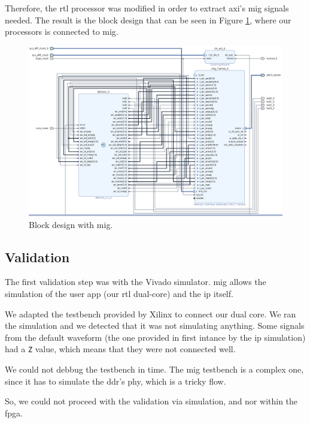 Therefore, the \gls{rtl} processor was modified in order to extract \gls{axi}'s \gls{mig} signals needed. 
The result is the block design that can be seen in Figure \ref{fig:bd_mig}, where our processors is connected to \gls{mig}.

    \begin{figure}
        \hspace{-3cm}
        \centering
        \includegraphics[width=1.2\textwidth]{../presentation/images/bd_ddr.png}
        \caption{Block design with \gls{mig}.}
        \label{fig:bd_mig}
    \end{figure}

\subsection{Validation}
The first validation step was with the Vivado simulator. 
\gls{mig} allows the simulation of the user app (our \gls{rtl} dual-core) and the \gls{ip} itself.

We adapted the testbench provided by Xilinx to connect our dual core. 
We ran the simulation and we detected that it was not simulating anything.
Some signals from the default waveform (the one provided in first intance by the \gls{ip} simulation) had a \texttt{Z} value, which means that they were not connected well.

We could not debbug the testbench in time.
The \gls{mig} testbench is a complex one, since it has to simulate the \gls{ddr}'s \gls{phy}, which is a tricky flow.

So, we could not proceed with the validation via simulation, and nor within the \gls{fpga}.

